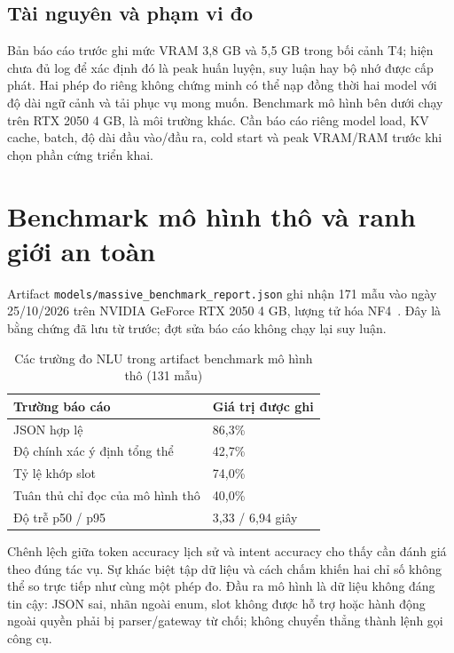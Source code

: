 \subsection{Tài nguyên và phạm vi đo}

Bản báo cáo trước ghi mức VRAM 3,8 GB và 5,5 GB trong bối cảnh T4; hiện chưa đủ log để xác định đó là peak huấn luyện, suy luận hay bộ nhớ được cấp phát. Hai phép đo riêng không chứng minh có thể nạp đồng thời hai model với độ dài ngữ cảnh và tải phục vụ mong muốn. Benchmark mô hình bên dưới chạy trên RTX 2050 4 GB, là môi trường khác. Cần báo cáo riêng model load, KV cache, batch, độ dài đầu vào/đầu ra, cold start và peak VRAM/RAM trước khi chọn phần cứng triển khai.

\section{Benchmark mô hình thô và ranh giới an toàn}
\label{sec:live_inference_evaluation}

Artifact \nolinkurl{models/massive_benchmark_report.json} ghi nhận 171 mẫu vào ngày 25/10/2026 trên NVIDIA GeForce RTX 2050 4 GB, lượng tử hóa NF4~\cite{model_benchmark_20261025}. Đây là bằng chứng đã lưu từ trước; đợt sửa báo cáo không chạy lại suy luận.

\begin{table}[!htbp]
\centering
\caption{Các trường đo NLU trong artifact benchmark mô hình thô (131 mẫu)}
\label{tab:raw_nlu_benchmark}
\small
\begin{tabularx}{\textwidth}{|X|C{3.2cm}|}
\hline
{}\textbf{Trường báo cáo} & \textbf{Giá trị được ghi} \\
\hline
JSON hợp lệ & 86,3\% \\
\hline
Độ chính xác ý định tổng thể & 42,7\% \\
\hline
Tỷ lệ khớp slot & 74,0\% \\
\hline
Tuân thủ chỉ đọc của mô hình thô & 40,0\% \\
\hline
Độ trễ p50 / p95 & 3,33 / 6,94 giây \\
\hline
\end{tabularx}
\end{table}

Chênh lệch giữa token accuracy lịch sử và intent accuracy cho thấy cần đánh giá theo đúng tác vụ. Sự khác biệt tập dữ liệu và cách chấm khiến hai chỉ số không thể so trực tiếp như cùng một phép đo. Đầu ra mô hình là dữ liệu không đáng tin cậy: JSON sai, nhãn ngoài enum, slot không được hỗ trợ hoặc hành động ngoài quyền phải bị parser/gateway từ chối; không chuyển thẳng thành lệnh gọi công cụ.

